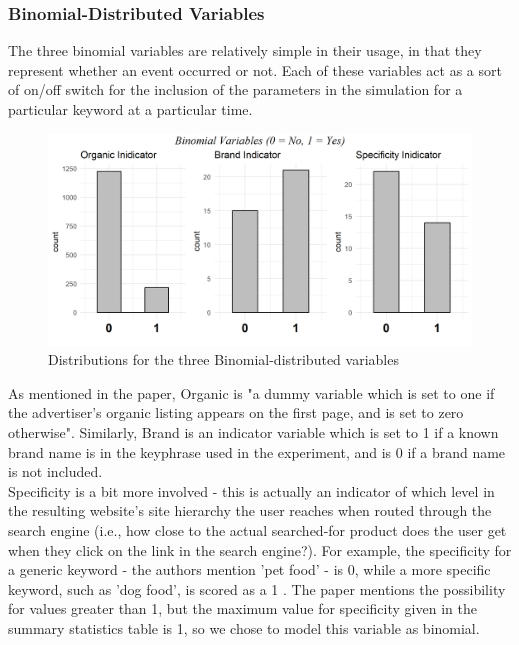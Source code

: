\subsubsection{Binomial-Distributed Variables}
The three binomial variables are relatively simple in their usage, in that they represent whether an event occurred or not. Each of these variables act as a sort of on/off switch for the inclusion of the parameters in the simulation for a particular keyword at a particular time.
\begin{figure}[!h]
    \centering
    \includegraphics[scale = 0.6]{binomial_plots.png}
    \caption{Distributions for the three Binomial-distributed variables}
    \label{fig:Binomial}
\end{figure}
As mentioned in the paper, Organic is "a dummy variable which is set to one if the advertiser's organic listing appears on the first page, and is set to zero otherwise"\citep[p. 20]{agarwal_organic_2015}. Similarly, Brand is an indicator variable which is set to 1 if a known brand name is in the keyphrase used in the experiment, and is 0 if a brand name is not included.\\
Specificity is a bit more involved - this is actually an indicator of which level in the resulting website's site hierarchy the user reaches when routed through the search engine (i.e., how close to the actual searched-for product does the user get when they click on the link in the search engine?). For example, the specificity for a generic keyword - the authors mention 'pet food' - is 0, while a more specific keyword, such as 'dog food', is scored as a 1 \citep{agarwal_organic_2015}. The paper mentions the possibility for values greater than 1, but the maximum value for specificity given in the summary statistics table is 1, so we chose to model this variable as binomial.

